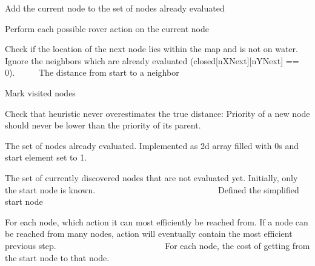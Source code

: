 Add the current node to the set of nodes already evaluated

Perform each possible rover action on the current node

Check if the location of the next node lies within the map and is not on water. Ignore the neighbors which are already evaluated (closed\mbox{[}n\+X\+Next\mbox{]}\mbox{[}n\+Y\+Next\mbox{]} == 0). ~\newline
~\newline
~\newline
 The distance from start to a neighbor

Mark visited nodes

Check that heuristic never overestimates the true distance\+: Priority of a new node should never be lower than the priority of its parent.

The set of nodes already evaluated. Implemented as 2d array filled with 0s and start element set to 1.

The set of currently discovered nodes that are not evaluated yet. Initially, only the start node is known. ~\newline
~\newline
~\newline
~\newline
~\newline
~\newline
~\newline
~\newline
~\newline
~\newline
~\newline
~\newline
~\newline
~\newline
~\newline
~\newline
~\newline
 Defined the simplified start node

For each node, which action it can most efficiently be reached from. If a node can be reached from many nodes, action will eventually contain the most efficient previous step. ~\newline
~\newline
~\newline
~\newline
~\newline
~\newline
~\newline
~\newline
~\newline
~\newline
~\newline
~\newline
~\newline
~\newline
~\newline
 For each node, the cost of getting from the start node to that node.

